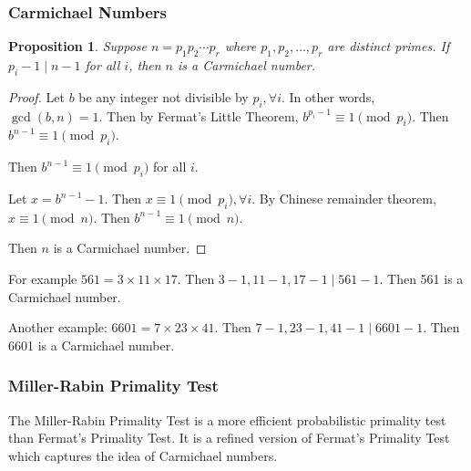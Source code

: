 \documentclass[letterpaper,12pt,oneside]{article}
\newtheorem*{proposition}{Proposition}
\begin{document}
\subsubsection{Carmichael Numbers}
\begin{proposition}
    Suppose $n=p_1 p_2 \cdots p_r$ where $p_1,p_2,\ldots,p_r$ are distinct primes. If $p_i -1\mid n-1$ for all $i$, then $n$ is a Carmichael number.
\end{proposition}
\begin{proof}
    Let $b$ be any integer not divisible by $p_i,\forall i$. In other words, $\gcd(b,n)=1$. Then by Fermat's Little Theorem, $b^{p_i-1}\equiv 1 \pmod {p_i}$. Then $b^{n-1}\equiv 1 \pmod {p_i}$.

    Then $b^{n-1}\equiv 1 \pmod {p_i}$ for all $i$. 
    
    Let $x=b^{n-1}-1$. Then $x\equiv 1 \pmod {p_i},\forall i$. By Chinese remainder theorem, $x\equiv 1 \pmod n$. Then $b^{n-1}\equiv 1 \pmod n$.
    
    Then $n$ is a Carmichael number.
\end{proof}
For example $561=3\times 11\times 17$. Then $3-1,11-1,17-1\mid 561-1$. Then 561 is a Carmichael number.

Another example: $6601=7\times 23\times 41$. Then $7-1,23-1,41-1\mid 6601-1$. Then 6601 is a Carmichael number.
\subsubsection{Miller-Rabin Primality Test}
The Miller-Rabin Primality Test is a more efficient probabilistic primality test than Fermat's Primality Test. It is a refined version of Fermat's Primality Test which captures the idea of Carmichael numbers.
\end{document}
